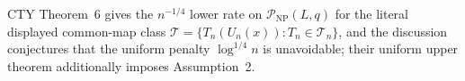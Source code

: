 CTY Theorem~6 gives the \(n^{-1/4}\) lower rate on \(\mathcal P_{\mathrm{NP}}(L,q)\) for the literal displayed common-map class \(\mathcal T=\{T_n(U_n(x)):T_n\in\mathcal T_n\}\), and the discussion conjectures that the uniform penalty \(\log^{1/4}n\) is unavoidable; their uniform upper theorem additionally imposes Assumption~2.